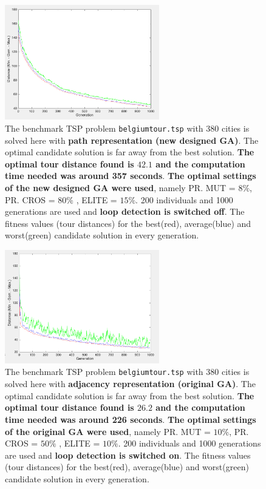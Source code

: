 \begin{figure}[!]
  \centering
    \includegraphics[width=0.6\textwidth]{../figures/figures_question_4/path_vraag4_off_gen}
      \caption{The benchmark TSP problem \texttt{belgiumtour.tsp} with 380 cities is solved here with \textbf{path representation (new designed GA)}. The optimal candidate solution is far away from the best solution. \textbf{The optimal tour distance found is $\mathbf{42.1}$ and the computation time needed was around 357 seconds}. \textbf{The optimal settings of the new designed GA were used}, namely PR. MUT = $8\%$, PR. CROS = $80\%$ , ELITE = $15\%$. 200 individuals and 1000 generations are used and \textbf{loop detection is switched off}. The fitness values (tour distances) for the best(red), average(blue) and worst(green) candidate solution in every generation.}
      \label{fig:path_vraag4_off_gen}
\end{figure}

\begin{figure}[!]
  \centering
    \includegraphics[width=0.6\textwidth]{../figures/figures_question_4/adj_vraag4_on_gen}
      \caption{The benchmark TSP problem \texttt{belgiumtour.tsp} with 380 cities is solved here with \textbf{adjacency representation (original GA)}. The optimal candidate solution is far away from the best solution. \textbf{The optimal tour distance found is $\mathbf{26.2}$ and the computation time needed was around 226 seconds}. \textbf{The optimal settings of the original GA were used}, namely PR. MUT = $10\%$, PR. CROS = $50\%$ , ELITE = $10\%$. 200 individuals and 1000 generations are used and \textbf{loop detection is switched on}. The fitness values (tour distances) for the best(red), average(blue) and worst(green) candidate solution in every generation.}
      \label{fig:adj_vraag4_on_gen}
\end{figure}

